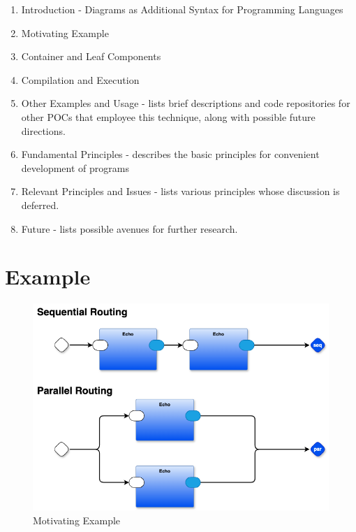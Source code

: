 \documentclass[10pt,anonymous,review]{acmart}
\begin{document}
\begin{enumerate}
\item Introduction - Diagrams as Additional Syntax for Programming
Languages

\item Motivating Example

\item Container and Leaf Components

\item Compilation and Execution

\item Other Examples and Usage - lists brief descriptions and
code repositories for other POCs that employee this technique, along
with possible future directions.

\item Fundamental Principles - describes the basic principles
for convenient development of programs

\item Relevant Principles and Issues - lists various
principles whose discussion is deferred.

\item Future - lists possible avenues for further research.

\end{enumerate}

\section{Example}

  \begin{figure}[h]
    \centering
    \includegraphics[width=0.8\linewidth]{./media/HelloWorld0D.png}
    \caption{Motivating Example}
    \label{mot}
  \end{figure}
\end{document}
